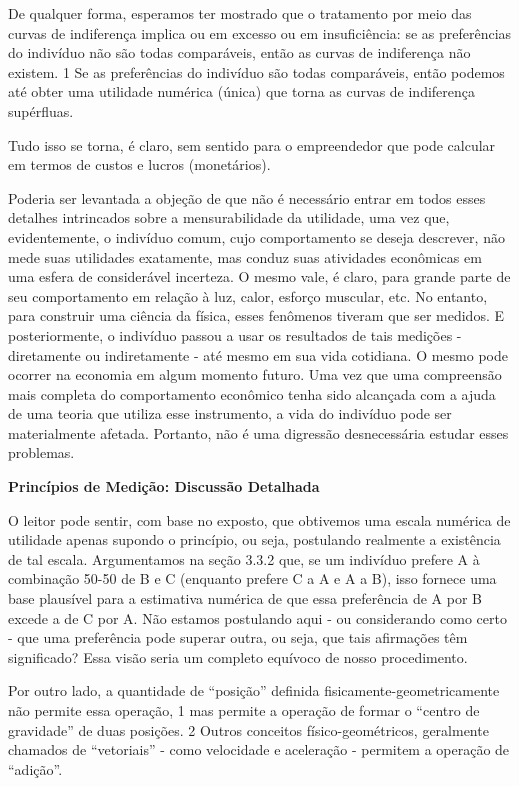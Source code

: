 \documentclass[a4paper,12pt]{article}[abntex2]
\begin{document}
De qualquer forma, esperamos ter mostrado que o tratamento por meio das curvas de indiferença implica ou em excesso ou em insuficiência: se as preferências do indivíduo não são todas comparáveis, então as curvas de indiferença não existem. 1 Se as preferências do indivíduo são todas comparáveis, então podemos até obter uma utilidade numérica (única) que torna as curvas de indiferença supérfluas.

Tudo isso se torna, é claro, sem sentido para o empreendedor que pode calcular em termos de custos e lucros (monetários).

Poderia ser levantada a objeção de que não é necessário entrar em todos esses detalhes intrincados sobre a mensurabilidade da utilidade, uma vez que, evidentemente, o indivíduo comum, cujo comportamento se deseja descrever, não mede suas utilidades exatamente, mas conduz suas atividades econômicas em uma esfera de considerável incerteza. O mesmo vale, é claro, para grande parte de seu comportamento em relação à luz, calor, esforço muscular, etc. No entanto, para construir uma ciência da física, esses fenômenos tiveram que ser medidos. E posteriormente, o indivíduo passou a usar os resultados de tais medições - diretamente ou indiretamente - até mesmo em sua vida cotidiana. O mesmo pode ocorrer na economia em algum momento futuro. Uma vez que uma compreensão mais completa do comportamento econômico tenha sido alcançada com a ajuda de uma teoria que utiliza esse instrumento, a vida do indivíduo pode ser materialmente afetada. Portanto, não é uma digressão desnecessária estudar esses problemas.

\textbf{Princípios de Medição: Discussão Detalhada}

O leitor pode sentir, com base no exposto, que obtivemos uma escala numérica de utilidade apenas supondo o princípio, ou seja, postulando realmente a existência de tal escala. Argumentamos na seção 3.3.2 que, se um indivíduo prefere A à combinação 50-50 de B e C (enquanto prefere C a A e A a B), isso fornece uma base plausível para a estimativa numérica de que essa preferência de A por B excede a de C por A. Não estamos postulando aqui - ou considerando como certo - que uma preferência pode superar outra, ou seja, que tais afirmações têm significado? Essa visão seria um completo equívoco de nosso procedimento.

Por outro lado, a quantidade de “posição” definida fisicamente-geometricamente não permite essa operação, 1 mas permite a operação de formar o “centro de gravidade” de duas posições. 2 Outros conceitos físico-geométricos, geralmente chamados de “vetoriais” - como velocidade e aceleração - permitem a operação de “adição”.
\end{document}

